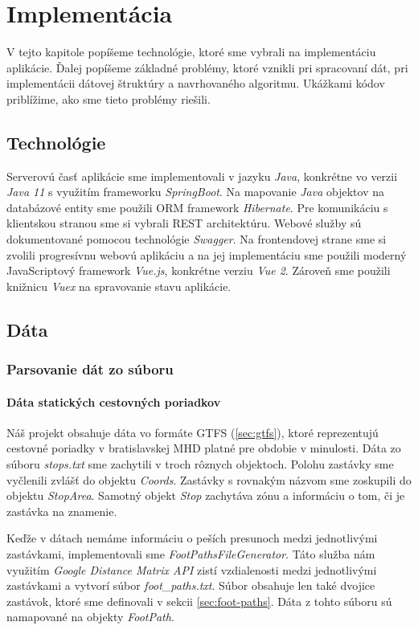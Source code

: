 \chapter{Implementácia}
\label{kap:imp}
V tejto kapitole popíšeme technológie, ktoré sme vybrali na implementáciu aplikácie. Ďalej popíšeme základné problémy, ktoré vznikli pri spracovaní dát, pri implementácii dátovej štruktúry a navrhovaného algoritmu. Ukážkami kódov priblížime, ako sme tieto problémy riešili. 

\section{Technológie}
Serverovú časť aplikácie sme implementovali v jazyku \textit{Java}, konkrétne vo verzii \textit{Java 11} s využitím frameworku \textit{SpringBoot}. Na mapovanie \textit{Java} objektov na databázové entity sme použili ORM framework \textit{Hibernate}. Pre komunikáciu s klientskou stranou sme si vybrali REST architektúru. Webové služby sú dokumentované pomocou technológie \textit{Swagger}. Na frontendovej strane sme si zvolili progresívnu webovú aplikáciu a na jej implementáciu sme použili moderný JavaScriptový framework \textit{Vue.js}, konkrétne verziu \textit{Vue 2}. Zároveň sme použili knižnicu \textit{Vuex} na spravovanie stavu aplikácie. 

\section{Dáta}
\subsection{Parsovanie dát zo súboru}
\label{sec:parsing}
\subsubsection{Dáta statických cestovných poriadkov}
Náš projekt obsahuje dáta vo formáte GTFS (\ref{sec:gtfs}), ktoré reprezentujú cestovné poriadky v bratislavskej MHD platné pre obdobie v minulosti. 
Dáta zo súboru \textit{stops.txt} sme zachytili v troch rôznych objektoch. Polohu zastávky sme vyčlenili zvlášť do objektu \textit{Coords}. Zastávky s rovnakým názvom sme zoskupili do objektu \textit{StopArea}. Samotný objekt \textit{Stop} zachytáva zónu a informáciu o tom, či je zastávka na znamenie. 

Keďže v dátach nemáme informáciu o peších presunoch medzi jednotlivými zastávkami, implementovali sme \textit{FootPathsFileGenerator}. Táto služba nám využitím \textit{Google Distance Matrix API} zistí vzdialenosti medzi jednotlivými zastávkami a vytvorí súbor \textit{foot\_paths.txt}. Súbor obsahuje len také dvojice zastávok, ktoré sme definovali v sekcii \ref{sec:foot-paths}. Dáta z tohto súboru sú namapované na objekty \textit{FootPath}. 

